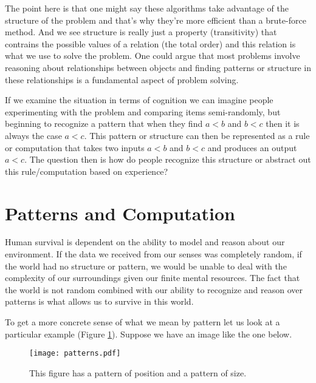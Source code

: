 \documentclass[a4paper,12pt]{article}
\begin{document}
The point here is that one might say these algorithms take advantage of the structure of the problem and that's why they're more efficient than a brute-force method.  And we see structure is really just a property (transitivity) that contrains the possible values of a relation (the total order) and this relation is what we use to solve the problem.  One could argue that most problems involve reasoning about relationships between objects and finding patterns or structure in these relationships is a fundamental aspect of problem solving.

If we examine the situation in terms of cognition we can imagine people experimenting with the problem and comparing items semi-randomly, but beginning to recognize a pattern that when they find $a<b$ and $b<c$ then it is always the case $a<c$.  This pattern or structure can then be represented as a rule or computation that takes two inputs $a<b$ and $b<c$ and produces an output $a<c$.  The question then is how do people recognize this structure or abstract out this rule/computation based on experience?

\section{Patterns and Computation}
  Human survival is dependent on the ability to model and reason about our environment.  If the data we received from our senses was completely random, if the world had no structure or pattern, we would be unable to deal with the complexity of our surroundings given our finite mental resources.  The fact that the world is not random combined with our ability to recognize and reason over patterns is what allows us to survive in this world.  

To get a more concrete sense of what we mean by pattern let us look at
a particular example (Figure \ref{fig:patterns}).  Suppose we have an image like the one below. 
\begin{figure}[htbp]
\begin{center}
\texttt{[image: patterns.pdf]}
\caption{This figure has a pattern of position and a pattern of size. }
\label{fig:patterns}
\end{center}
\end{figure}
\end{document}
